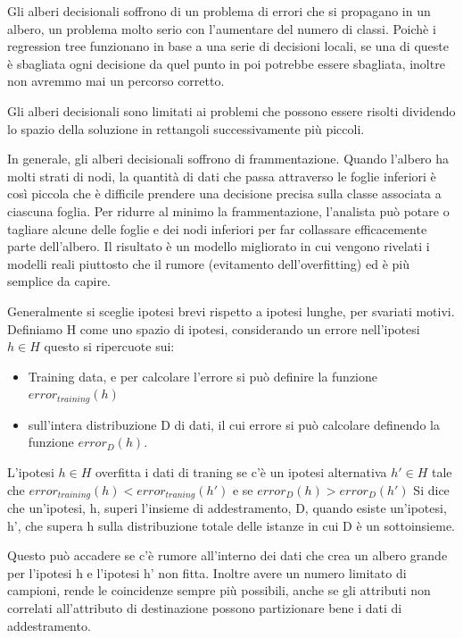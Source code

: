 \documentclass[a4paper]{extarticle}
\begin{document}
Gli alberi decisionali soffrono di un problema di errori che si propagano in un albero, un problema molto serio con l'aumentare del numero di classi. Poichè i regression tree funzionano in base a una serie di decisioni locali, se una di queste è sbagliata ogni decisione da quel punto in poi potrebbe essere sbagliata, inoltre non avremmo mai un percorso corretto.

Gli alberi decisionali sono limitati ai problemi che possono essere risolti dividendo lo spazio della soluzione in rettangoli successivamente più piccoli.


In generale, gli alberi decisionali soffrono di frammentazione. Quando l'albero ha molti strati di nodi, la quantità di dati che passa attraverso le foglie inferiori è così piccola che è difficile prendere una decisione precisa sulla classe associata a ciascuna foglia. Per ridurre al minimo la frammentazione, l'analista può potare o tagliare alcune delle foglie e dei nodi inferiori per far collassare efficacemente parte dell'albero. Il risultato è un modello migliorato in cui vengono rivelati i modelli reali piuttosto che il rumore (evitamento dell'overfitting) ed è più semplice da capire.

Generalmente si sceglie ipotesi brevi rispetto a ipotesi lunghe, per svariati motivi. Definiamo H come uno spazio di ipotesi, considerando un errore  nell'ipotesi $h \in H$ questo si ripercuote sui:
\begin{itemize}
\item Training data, e per calcolare l'errore si può definire la funzione $error_{training}(h)$
\item sull'intera distribuzione D di dati, il cui errore si può calcolare definendo la funzione $error_D(h)$.
\end{itemize} 

L'ipotesi $h \in H$ overfitta i dati di traning se c'è un ipotesi alternativa $h' \in H$ tale che $error_{training}(h)<error_{traning}(h')$ e se $error_D(h)>error_D(h')$ Si dice che un'ipotesi, h, superi l'insieme di addestramento, D, quando esiste un'ipotesi, h', che supera h sulla distribuzione totale delle istanze in cui D è un sottoinsieme.

Questo può accadere se c'è rumore all'interno dei dati che crea un albero grande per l'ipotesi h e l'ipotesi h' non fitta. Inoltre avere un numero limitato di campioni, rende le coincidenze sempre più possibili, anche se gli attributi non correlati all'attributo di destinazione possono partizionare bene i dati di addestramento.
\end{document}

